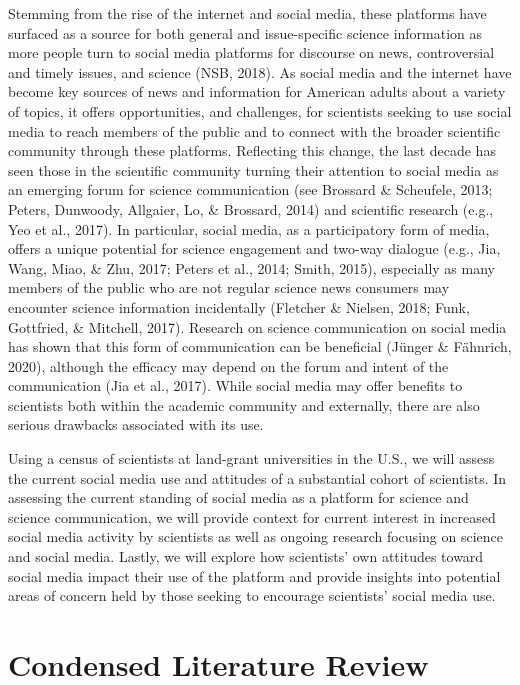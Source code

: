 \documentclass[12pt,]{article}
\begin{document}
Stemming from the rise of the internet and social media, these platforms have surfaced as a source for both general and issue-specific science information as more people turn to social media platforms for discourse on news, controversial and timely issues, and science (NSB, 2018). As social media and the internet have become key sources of news and information for American adults about a variety of topics, it offers opportunities, and challenges, for scientists seeking to use social media to reach members of the public and to connect with the broader scientific community through these platforms. Reflecting this change, the last decade has seen those in the scientific community turning their attention to social media as an emerging forum for science communication (see Brossard \& Scheufele, 2013; Peters, Dunwoody, Allgaier, Lo, \& Brossard, 2014) and scientific research (e.g., Yeo et al., 2017). In particular, social media, as a participatory form of media, offers a unique potential for science engagement and two-way dialogue (e.g., Jia, Wang, Miao, \& Zhu, 2017; Peters et al., 2014; Smith, 2015), especially as many members of the public who are not regular science news consumers may encounter science information incidentally (Fletcher \& Nielsen, 2018; Funk, Gottfried, \& Mitchell, 2017). Research on science communication on social media has shown that this form of communication can be beneficial (Jünger \& Fähnrich, 2020), although the efficacy may depend on the forum and intent of the communication (Jia et al., 2017). While social media may offer benefits to scientists both within the academic community and externally, there are also serious drawbacks associated with its use.

Using a census of scientists at land-grant universities in the U.S., we will assess the current social media use and attitudes of a substantial cohort of scientists. In assessing the current standing of social media as a platform for science and science communication, we will provide context for current interest in increased social media activity by scientists as well as ongoing research focusing on science and social media. Lastly, we will explore how scientists' own attitudes toward social media impact their use of the platform and provide insights into potential areas of concern held by those seeking to encourage scientists' social media use.

\hypertarget{condensed-literature-review}{%
\section{Condensed Literature Review}\label{condensed-literature-review}}
\end{document}
